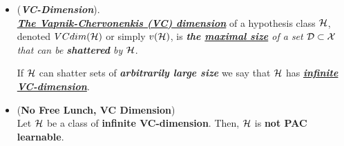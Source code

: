 \documentclass[11pt]{article}
\begin{document}
\begin{itemize}
\item \begin{definition} (\emph{\textbf{VC-Dimension}}). \\
\underline{\emph{\textbf{The Vapnik-Chervonenkis (VC) dimension}}} of a hypothesis class ${\mathcal H}$, denoted $VCdim({\mathcal H})$ or simply $v({\mathcal H})$, is \emph{\textbf{the \underline{maximal size}} of a set ${\mathcal D} \subset {\mathcal X}$ that can be \textbf{shattered} by ${\mathcal H}$}.

If ${\mathcal H}$ can shatter sets of \emph{\textbf{arbitrarily large size}} we say that ${\mathcal H}$ has \underline{\emph{\textbf{infinite VC-dimension}}}.
\end{definition}

\item \begin{theorem} (\textbf{No Free Lunch, VC Dimension}) \citep{shalev2014understanding}\\
Let ${\mathcal H}$ be a class of \textbf{infinite VC-dimension}. Then, ${\mathcal H}$ is \textbf{not PAC learnable}.
\end{theorem}

\end{itemize}
\end{document}
